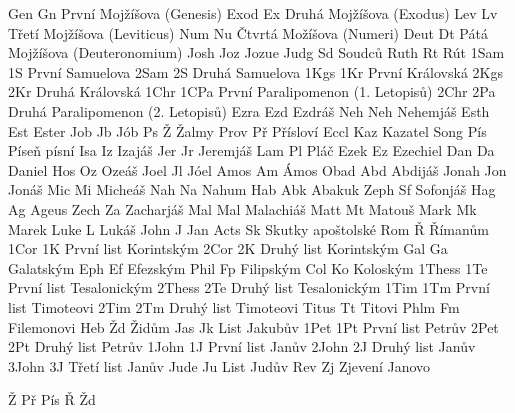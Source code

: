 \BookTitle Gen  Gn {První Mojžíšova (Genesis)}
\BookTitle Exod Ex {Druhá Mojžíšova (Exodus)}
\BookTitle Lev  Lv {Třetí Mojžíšova (Leviticus)}
\BookTitle Num  Nu {Čtvrtá Možíšova (Numeri)}
\BookTitle Deut Dt {Pátá Mojžíšova (Deuteronomium)}
\BookTitle Josh Joz {Jozue}
\BookTitle Judg Sd {Soudců}
\BookTitle Ruth Rt {Rút}
\BookTitle 1Sam 1S {První Samuelova}
\BookTitle 2Sam 2S {Druhá Samuelova}
\BookTitle 1Kgs 1Kr {První Královská}
\BookTitle 2Kgs 2Kr {Druhá Královská}
\BookTitle 1Chr 1CPa {První Paralipomenon (1. Letopisů)}
\BookTitle 2Chr 2Pa {Druhá Paralipomenon (2. Letopisů)}
\BookTitle Ezra Ezd {Ezdráš}
\BookTitle Neh  Neh {Nehemjáš}
\BookTitle Esth Est {Ester}
\BookTitle Job  Jb {Jób}
\BookTitle Ps   Ž {Žalmy}
\BookTitle Prov Př {Přísloví}
\BookTitle Eccl Kaz {Kazatel}
\BookTitle Song Pís {Píseň písní}
\BookTitle Isa  Iz {Izajáš}
\BookTitle Jer  Jr {Jeremjáš}
\BookTitle Lam  Pl {Pláč}
\BookTitle Ezek Ez {Ezechiel}
\BookTitle Dan  Da {Daniel}
\BookTitle Hos  Oz {Ozeáš}
\BookTitle Joel Jl {Jóel}
\BookTitle Amos Am {Ámos}
\BookTitle Obad Abd {Abdijáš}
\BookTitle Jonah Jon {Jonáš}
\BookTitle Mic  Mi {Micheáš}
\BookTitle Nah  Na {Nahum}
\BookTitle Hab  Abk {Abakuk}
\BookTitle Zeph Sf {Sofonjáš}
\BookTitle Hag  Ag {Ageus}
\BookTitle Zech Za {Zacharjáš}
\BookTitle Mal  Mal {Malachiáš}
\BookTitle Matt Mt {Matouš}
\BookTitle Mark Mk {Marek}
\BookTitle Luke L {Lukáš}
\BookTitle John J {Jan}
\BookTitle Acts Sk {Skutky apoštolské}
\BookTitle Rom  Ř {Římanům}
\BookTitle 1Cor 1K {První list Korintským}
\BookTitle 2Cor 2K {Druhý list Korintským}
\BookTitle Gal  Ga {Galatským}
\BookTitle Eph  Ef {Efezským}
\BookTitle Phil Fp {Filipským}
\BookTitle Col  Ko {Koloským}
\BookTitle 1Thess 1Te {První list Tesalonickým}
\BookTitle 2Thess 2Te {Druhý list Tesalonickým}
\BookTitle 1Tim 1Tm {První list Timoteovi}
\BookTitle 2Tim 2Tm {Druhý list Timoteovi}
\BookTitle Titus Tt {Titovi}
\BookTitle Phlm  Fm {Filemonovi}
\BookTitle Heb   Žd {Židům}
\BookTitle Jas   Jk {List Jakubův}
\BookTitle 1Pet  1Pt {První list Petrův}
\BookTitle 2Pet  2Pt {Druhý list Petrův}
\BookTitle 1John 1J {První list Janův}
\BookTitle 2John 2J {Druhý list Janův}
\BookTitle 3John 3J {Třetí list Janův}
\BookTitle Jude  Ju {List Judův}
\BookTitle Rev   Zj {Zjevení Janovo}     

\BookException Ž   {\def\amark{Z}}
\BookException Př  {\def\amark{Pr}}
\BookException Pís {\def\amark{Pis}}
\BookException Ř   {\def\amark{R}}
\BookException Žd  {\def\amark{Zd}}

\def\nochapbooks{Abd Fm 2Jn 3Jn Ju}
